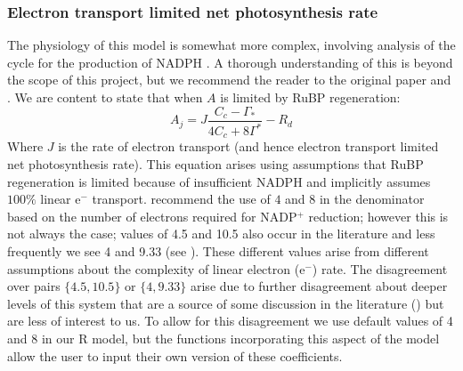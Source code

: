 \documentclass[11pt]{article} %
\begin{document}
\subsubsection{Electron transport limited net photosynthesis rate}
The physiology of this model is somewhat more complex, involving analysis of the cycle for the production of NADPH \cite{Farquharbiochemicalmodelphotosynthetic1980}. A thorough understanding of this is beyond the scope of this project, but we recommend the reader to the original paper \cite{Farquharbiochemicalmodelphotosynthetic1980} and \citet{CaemmererBiochemicalmodelsleaf2000}. We are content to state that when $A$ is limited by RuBP regeneration:
\begin{equation} \label{RuBP_photosynthesis}
A_j = J\frac{C_c - \Gamma_*}{4C_c + 8\Gamma^*}-R_d
\end{equation}
Where $J$ is the rate of electron transport (and hence electron transport limited net photosynthesis rate). This equation arises using assumptions that RuBP regeneration is limited because of insufficient NADPH and implicitly assumes $100\%$  linear e$^-$ transport. \citet{SharkeyFittingphotosyntheticcarbon2007} recommend the use of $4$ and $8$ in the denominator based on the number of electrons required for NADP$^+$ reduction; however this is not always the case; values of 4.5 and 10.5 also occur in the literature and less frequently we see 4 and 9.33 (see \cite{SharkeyFittingphotosyntheticcarbon2007}\cite{YinUsingcombinedmeasurements2009}\cite{YinC3C4photosynthesis2009}). These different values arise from different assumptions about the complexity of linear electron (e$^-$) rate. The disagreement over pairs $\{4.5, 10.5\}$ or $\{4, 9.33\}$ arise due to further disagreement about deeper levels of this system that are a source of some discussion in the literature (\cite{CaemmererBiochemicalmodelsleaf2000}\cite{YinUsingcombinedmeasurements2009}) but are less of interest to us. To allow for this disagreement we use default values of 4 and 8 in our R model, but the functions incorporating this aspect of the model allow the user to input their own version of these coefficients.
\end{document}
